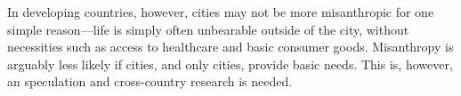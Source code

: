 \documentclass[11pt, letterpaper]{article}
\begin{document}
\begin{spacing}{1.4}
In developing countries, however, cities may not be more misanthropic for one simple
reason---life is simply often unbearable outside of the city, without necessities such as access to healthcare and basic consumer goods. Misanthropy is arguably less likely if cities, and only cities, provide basic needs. This is, however, an speculation and cross-country research is needed.






  

  



\end{spacing}
\end{document}
